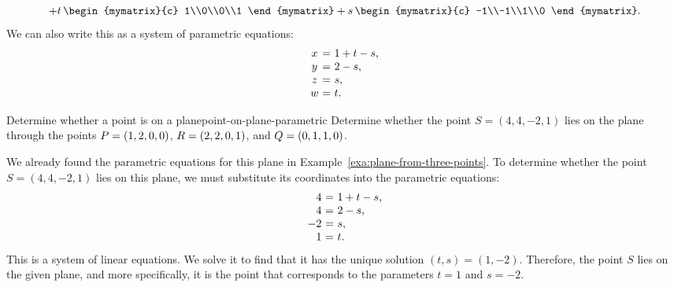 \begin{solution}
\begin{equation*}
    + t\,\begin{mymatrix}{c} 1\\0\\0\\1 \end{mymatrix}
    + s\,\begin{mymatrix}{c} -1\\-1\\1\\0 \end{mymatrix}.
  \end{equation*}
  We can also write this as a system of parametric equations:
  \begin{equation*}
    \begin{array}{c@{~}c@{~}l}
      x &=& 1 + t - s, \\
      y &=& 2 - s, \\
      z &=& s, \\
      w &=& t.
    \end{array}
  \end{equation*}
\end{solution}

\begin{example}{Determine whether a point is on a plane}{point-on-plane-parametric}
  Determine whether the point $S=(4,4,-2,1)$ lies on the plane through
  the points $P = \left(1,2,0,0\right)$, $R = \left(2,2,0,1\right)$, and
  $Q = \left(0,1,1,0\right)$.
\end{example}

\begin{solution}
  We already found the parametric equations for this plane in
  Example~\ref{exa:plane-from-three-points}. To determine whether the
  point $S=(4,4,-2,1)$ lies on this plane, we must substitute its
  coordinates into the parametric equations:
  \begin{equation*}
    \begin{array}{r@{~}c@{~}l}
      4 &=& 1 + t - s, \\
      4 &=& 2 - s, \\
      -2 &=& s, \\
      1 &=& t.
    \end{array}
  \end{equation*}
  This is a system of linear equations. We solve it to find that it
  has the unique solution $(t,s) = (1,-2)$. Therefore, the point $S$
  lies on the given plane, and more specifically, it is the point that
  corresponds to the parameters $t=1$ and $s=-2$.
\end{solution}

